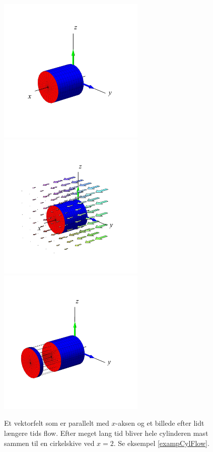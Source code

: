 \begin{figure}[ht]
\centerline{\includegraphics[width=70mm]{FIGS/plotCylFlow1}\includegraphics[width=70mm]{FIGS/plotCylFlow2}\includegraphics[width=70mm]{FIGS/plotCylFlow3}}
\begin{center}
\caption{\small{Et vektorfelt som er parallelt med $x$-aksen og et billede efter lidt længere tids flow. Efter meget lang tid bliver hele cylinderen mast sammen til en cirkelskive ved $x=2$.
Se eksempel \ref{exampCylFlow}.}} \label{figCylFlow}
\end{center}
\end{figure}

